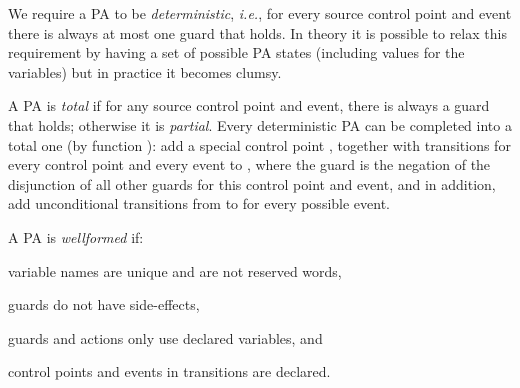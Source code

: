 We require a PA to be \emph{deterministic}, \emph{i.e.}, for every source
control point and event there is always at most one guard that holds.
In theory it is possible to relax this requirement by having a set of
possible PA states (including values for the variables) but in practice it
becomes clumsy.

A PA is \emph{total} if for any source control point and event,
there is always a guard that holds; otherwise it is
\emph{partial}. Every deterministic PA can be completed into a total
one (by function \complete): add a special control point
\halted, together with transitions for every control point and every event
to \halted, where the guard is the negation of the
disjunction of all other guards for this control point and event, and
in addition, add unconditional transitions from \halted to \halted
for every possible event.

A PA is \emph{wellformed} if:
\begin{inparaenum}
\item variable names are unique and are not reserved words,
\item guards do not have side-effects,
\item guards and actions only use declared variables, and
\item control points and events in transitions are declared.
\end{inparaenum}

